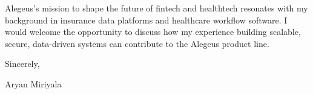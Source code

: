 \documentclass[letterpaper,11pt]{article}
\begin{document}
\vspace{8pt}

\noindent
Alegeus's mission to shape the future of fintech and healthtech resonates with my background in insurance data platforms and healthcare workflow software. I would welcome the opportunity to discuss how my experience building scalable, secure, data-driven systems can contribute to the Alegeus product line.

\vspace{16pt}

\noindent
Sincerely,

\vspace{12pt}

\noindent
Aryan Miriyala
\end{document}

